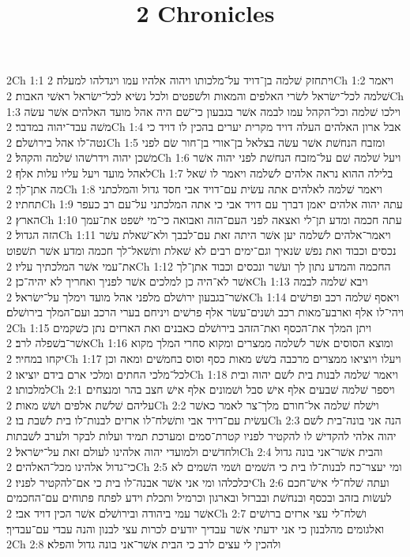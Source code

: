 

\title{2 Chronicles}

2Ch 1:1  ויתחזק שׁלמה בן־דויד על־מלכותו ויהוה אלהיו עמו ויגדלהו למעלה׃
2Ch 1:2  ויאמר שׁלמה לכל־ישׂראל לשׂרי האלפים והמאות ולשׁפטים ולכל נשׂיא לכל־ישׂראל ראשׁי האבות׃
2Ch 1:3  וילכו שׁלמה וכל־הקהל עמו לבמה אשׁר בגבעון כי־שׁם היה אהל מועד האלהים אשׁר עשׂה משׁה עבד־יהוה במדבר׃
2Ch 1:4  אבל ארון האלהים העלה דויד מקרית יערים בהכין לו דויד כי נטה־לו אהל בירושׁלם׃
2Ch 1:5  ומזבח הנחשׁת אשׁר עשׂה בצלאל בן־אורי בן־חור שׂם לפני משׁכן יהוה וידרשׁהו שׁלמה והקהל׃
2Ch 1:6  ויעל שׁלמה שׁם על־מזבח הנחשׁת לפני יהוה אשׁר לאהל מועד ויעל עליו עלות אלף׃
2Ch 1:7  בלילה ההוא נראה אלהים לשׁלמה ויאמר לו שׁאל מה אתן־לך׃
2Ch 1:8  ויאמר שׁלמה לאלהים אתה עשׂית עם־דויד אבי חסד גדול והמלכתני תחתיו׃
2Ch 1:9  עתה יהוה אלהים יאמן דברך עם דויד אבי כי אתה המלכתני על־עם רב כעפר הארץ׃
2Ch 1:10  עתה חכמה ומדע תן־לי ואצאה לפני העם־הזה ואבואה כי־מי ישׁפט את־עמך הזה הגדול׃
2Ch 1:11  ויאמר־אלהים לשׁלמה יען אשׁר היתה זאת עם־לבבך ולא־שׁאלת עשׁר נכסים וכבוד ואת נפשׁ שׂנאיך וגם־ימים רבים לא שׁאלת ותשׁאל־לך חכמה ומדע אשׁר תשׁפוט את־עמי אשׁר המלכתיך עליו׃
2Ch 1:12  החכמה והמדע נתון לך ועשׁר ונכסים וכבוד אתן־לך אשׁר לא־היה כן למלכים אשׁר לפניך ואחריך לא יהיה־כן׃
2Ch 1:13  ויבא שׁלמה לבמה אשׁר־בגבעון ירושׁלם מלפני אהל מועד וימלך על־ישׂראל׃
2Ch 1:14  ויאסף שׁלמה רכב ופרשׁים ויהי־לו אלף וארבע־מאות רכב ושׁנים־עשׂר אלף פרשׁים ויניחם בערי הרכב ועם־המלך בירושׁלם׃
2Ch 1:15  ויתן המלך את־הכסף ואת־הזהב בירושׁלם כאבנים ואת הארזים נתן כשׁקמים אשׁר־בשׁפלה לרב׃
2Ch 1:16  ומוצא הסוסים אשׁר לשׁלמה ממצרים ומקוא סחרי המלך מקוא יקחו במחיר׃
2Ch 1:17  ויעלו ויוציאו ממצרים מרכבה בשׁשׁ מאות כסף וסוס בחמשׁים ומאה וכן לכל־מלכי החתים ומלכי ארם בידם יוציאו׃
2Ch 1:18  ויאמר שׁלמה לבנות בית לשׁם יהוה ובית למלכותו׃
2Ch 2:1  ויספר שׁלמה שׁבעים אלף אישׁ סבל ושׁמונים אלף אישׁ חצב בהר ומנצחים עליהם שׁלשׁת אלפים ושׁשׁ מאות׃
2Ch 2:2  וישׁלח שׁלמה אל־חורם מלך־צר לאמר כאשׁר עשׂית עם־דויד אבי ותשׁלח־לו ארזים לבנות־לו בית לשׁבת בו׃
2Ch 2:3  הנה אני בונה־בית לשׁם יהוה אלהי להקדישׁ לו להקטיר לפניו קטרת־סמים ומערכת תמיד ועלות לבקר ולערב לשׁבתות ולחדשׁים ולמועדי יהוה אלהינו לעולם זאת על־ישׂראל׃
2Ch 2:4  והבית אשׁר־אני בונה גדול כי־גדול אלהינו מכל־האלהים׃
2Ch 2:5  ומי יעצר־כח לבנות־לו בית כי השׁמים ושׁמי השׁמים לא יכלכלהו ומי אני אשׁר אבנה־לו בית כי אם־להקטיר לפניו׃
2Ch 2:6  ועתה שׁלח־לי אישׁ־חכם לעשׂות בזהב ובכסף ובנחשׁת ובברזל ובארגון וכרמיל ותכלת וידע לפתח פתוחים עם־החכמים אשׁר עמי ביהודה ובירושׁלם אשׁר הכין דויד אבי׃
2Ch 2:7  ושׁלח־לי עצי ארזים ברושׁים ואלגומים מהלבנון כי אני ידעתי אשׁר עבדיך יודעים לכרות עצי לבנון והנה עבדי עם־עבדיך׃
2Ch 2:8  ולהכין לי עצים לרב כי הבית אשׁר־אני בונה גדול והפלא׃
